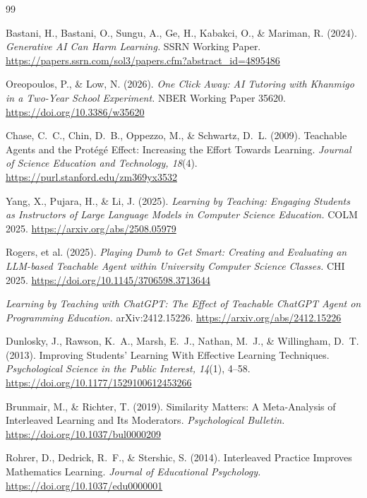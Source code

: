 \documentclass[11pt,a4paper]{article}
\begin{document}
\begin{thebibliography}{99}
\small
\setlength{\itemsep}{1pt}
\setlength{\parsep}{0pt}

 Bastani, H., Bastani, O., Sungu, A., Ge, H., Kabakci, O., \& Mariman,
R. (2024). \emph{Generative AI Can Harm Learning.} SSRN Working Paper.
\url{https://papers.ssrn.com/sol3/papers.cfm?abstract_id=4895486}

 Oreopoulos, P., \& Low, N. (2026). \emph{One Click Away: AI Tutoring
with Khanmigo in a Two-Year School Experiment.} NBER Working Paper 35620.
\url{https://doi.org/10.3386/w35620}

 Chase, C.~C., Chin, D.~B., Oppezzo, M., \& Schwartz, D.~L. (2009).
Teachable Agents and the Prot\'eg\'e Effect: Increasing the Effort Towards Learning.
\emph{Journal of Science Education and Technology, 18}(4).
\url{https://purl.stanford.edu/zm369yx3532}

 Yang, X., Pujara, H., \& Li, J. (2025). \emph{Learning by Teaching:
Engaging Students as Instructors of Large Language Models in Computer Science Education.}
COLM 2025. \url{https://arxiv.org/abs/2508.05979}

 Rogers, et al. (2025). \emph{Playing Dumb to Get Smart: Creating and
Evaluating an LLM-based Teachable Agent within University Computer Science Classes.} CHI
2025. \url{https://doi.org/10.1145/3706598.3713644}

 \emph{Learning by Teaching with ChatGPT: The Effect of Teachable
ChatGPT Agent on Programming Education.} arXiv:2412.15226.
\url{https://arxiv.org/abs/2412.15226}

 Dunlosky, J., Rawson, K.~A., Marsh, E.~J., Nathan, M.~J., \&
Willingham, D.~T. (2013). Improving Students' Learning With Effective Learning Techniques.
\emph{Psychological Science in the Public Interest, 14}(1), 4--58.
\url{https://doi.org/10.1177/1529100612453266}

 Brunmair, M., \& Richter, T. (2019). Similarity Matters: A
Meta-Analysis of Interleaved Learning and Its Moderators. \emph{Psychological Bulletin.}
\url{https://doi.org/10.1037/bul0000209}

 Rohrer, D., Dedrick, R.~F., \& Stershic, S. (2014). Interleaved
Practice Improves Mathematics Learning. \emph{Journal of Educational Psychology.}
\url{https://doi.org/10.1037/edu0000001}


\end{thebibliography}
\end{document}
